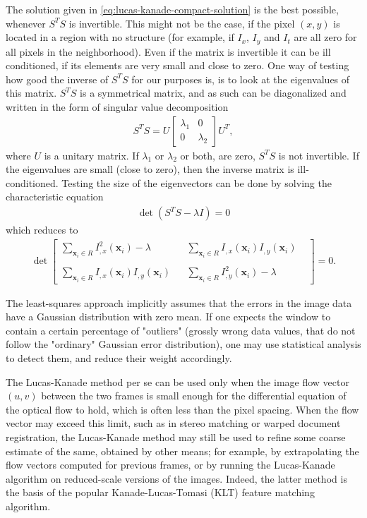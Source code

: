 \documentclass[letterpaper,12pt]{article}
\begin{document}
The solution given in \eqref{eq:lucas-kanade-compact-solution} is the best possible, whenever $S^T S$ is invertible.
This might not be the case, if the pixel $(x, y)$ is located in a region with
no structure (for example, if $I_x$, $I_y$ and $I_t$ are all zero for all pixels in the neighborhood). Even if the matrix is invertible it can be ill conditioned, if its elements are very small and close to zero. One way of testing how good the inverse of $S^T S$ for our purposes is, is to
look at the eigenvalues of this matrix. $S^T S$ is a symmetrical matrix, and as
such can be diagonalized and written in the form of singular value decomposition
\begin{align}
S^T S = U \begin{bmatrix}  
\lambda_1 & 0 \\
0 & \lambda_2
\end{bmatrix} U^T,
\end{align}
where $U$ is a unitary matrix. If $\lambda_1$ or $\lambda_2$ or both,
are zero, $S^T S$ is not invertible. If the eigenvalues are small (close to zero), then the inverse matrix is
ill-conditioned. Testing the size of the eigenvectors can be done by solving the characteristic
equation
\begin{align}
\det (S^T S - \lambda I) = 0
\end{align}
which reduces to
\begin{align}
\det \begin{bmatrix}
\sum_{\mathbf{x}_i \in R} I_{,x}^2(\mathbf{x}_i) - \lambda & &  \sum_{\mathbf{x}_i \in R} I_{,x}(\mathbf{x}_i)I_{,y}(\mathbf{x}_i)\\ 
& & & \\
\sum_{\mathbf{x}_i \in R} I_{,x}(\mathbf{x}_i)I_{,y}(\mathbf{x}_i) & & \sum_{\mathbf{x}_i \in R} I_{,y}^2(\mathbf{x}_i) - \lambda
\end{bmatrix} = 0.
\end{align}

The least-squares approach implicitly assumes that the errors in the image data have a Gaussian distribution with zero mean. If one expects the window to contain a certain percentage of "outliers" (grossly wrong data values, that do not follow the "ordinary" Gaussian error distribution), one may use statistical analysis to detect them, and reduce their weight accordingly.

The Lucas-Kanade method per se can be used only when the image flow vector $(u,v)$ between the two frames is small enough for the differential equation of the optical flow to hold, which is often less than the pixel spacing. When the flow vector may exceed this limit, such as in stereo matching or warped document registration, the Lucas-Kanade method may still be used to refine some coarse estimate of the same, obtained by other means; for example, by extrapolating the flow vectors computed for previous frames, or by running the Lucas-Kanade algorithm on reduced-scale versions of the images. Indeed, the latter method is the basis of the popular Kanade-Lucas-Tomasi (KLT) feature matching algorithm.
\newpage
\end{document}

